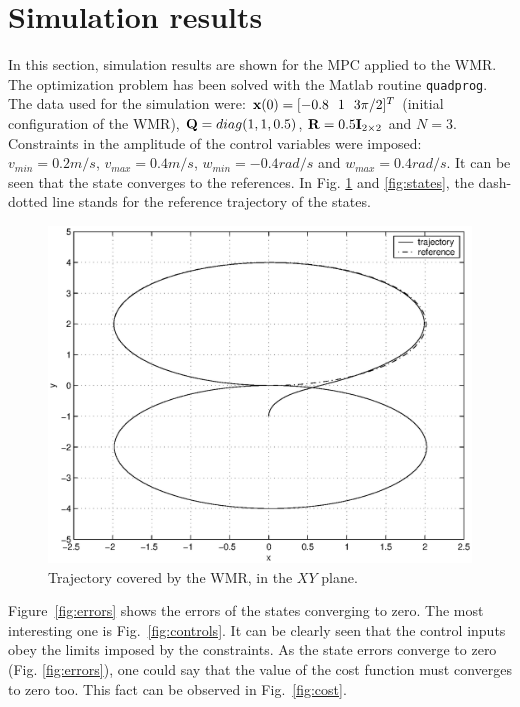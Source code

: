 \documentclass[conference]{IEEEtran} %
\begin{document}
\section{Simulation results}
\label{sec:simulations}

In this section, simulation results are shown for the MPC applied to the
WMR. The optimization problem has been solved with the {\sc Matlab} routine
{\tt quadprog}. The data used for the simulation were: ${\bf
x}(0)=[-0.8~~1~~3\pi/2]^T$ (initial configuration of the WMR), ${\bf Q}=diag(1,1,0.5)$, ${\bf R}=0.5{\bf I}_{2\times 2}$ and $N=3$. Constraints in
the amplitude of the control variables were imposed: $v_{min}=0.2 m/s$,
$v_{max}=0.4 m/s$, $w_{min}=-0.4 rad/s$ and $w_{max}=0.4 rad/s$. It can be
seen that the state converges to the references. In Fig. \ref{fig:traj8} and
\ref{fig:states}, the dash-dotted line stands for the reference trajectory
of the states.

\begin{figure}\begin{center}
    \includegraphics[width=.99\linewidth]{Figures/traj8.eps}
    \caption{Trajectory covered by the WMR, in the $XY$ plane.}
    \label{fig:traj8}
\end{center}\end{figure}

Figure~\ref{fig:errors} shows the errors of the states converging to zero. The
most interesting one is Fig.~\ref{fig:controls}. It can be clearly seen that
the control inputs obey the limits imposed by the constraints. As the state
errors converge to zero (Fig. \ref{fig:errors}), one could say that the
value of the cost function must converges to zero too. This fact can be
observed in Fig.~\ref{fig:cost}.
\end{document}
